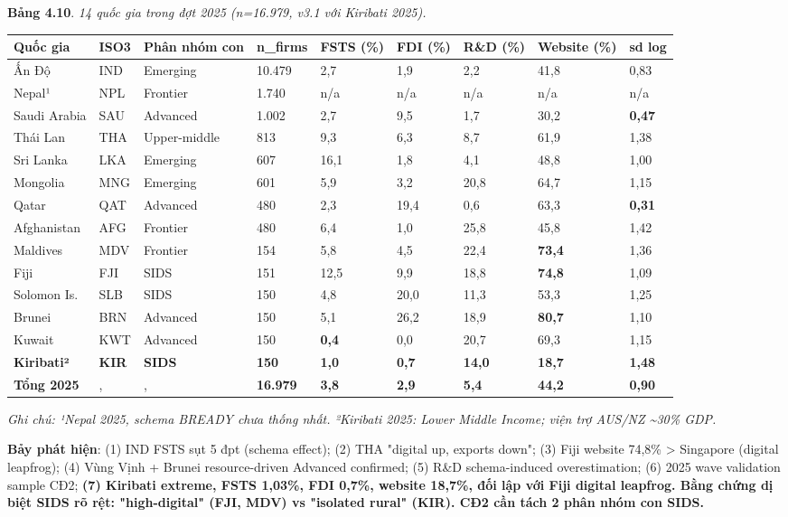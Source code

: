 \documentclass[12pt,a4paper]{article}
\begin{document}
\textbf{Bảng 4.10}. \emph{14 quốc gia trong đợt 2025 (n=16.979, v3.1 với
Kiribati 2025).}

\begin{longtable}[]{@{}lllllllll@{}}
\toprule\noalign{}
Quốc gia & ISO3 & Phân nhóm con & n\_firms & FSTS (\%) & FDI (\%) & R\&D
(\%) & Website (\%) & sd log \\
\midrule\noalign{}
\endhead
\bottomrule\noalign{}
\endlastfoot
Ấn Độ & IND & Emerging & 10.479 & 2,7 & 1,9 & 2,2 & 41,8 & 0,83 \\
Nepal¹ & NPL & Frontier & 1.740 & n/a & n/a & n/a & n/a & n/a \\
Saudi Arabia & SAU & Advanced & 1.002 & 2,7 & 9,5 & 1,7 & 30,2 &
\textbf{0,47} \\
Thái Lan & THA & Upper-middle & 813 & 9,3 & 6,3 & 8,7 & 61,9 & 1,38 \\
Sri Lanka & LKA & Emerging & 607 & 16,1 & 1,8 & 4,1 & 48,8 & 1,00 \\
Mongolia & MNG & Emerging & 601 & 5,9 & 3,2 & 20,8 & 64,7 & 1,15 \\
Qatar & QAT & Advanced & 480 & 2,3 & 19,4 & 0,6 & 63,3 &
\textbf{0,31} \\
Afghanistan & AFG & Frontier & 480 & 6,4 & 1,0 & 25,8 & 45,8 & 1,42 \\
Maldives & MDV & Frontier & 154 & 5,8 & 4,5 & 22,4 & \textbf{73,4} &
1,36 \\
Fiji & FJI & SIDS & 151 & 12,5 & 9,9 & 18,8 & \textbf{74,8} & 1,09 \\
Solomon Is. & SLB & SIDS & 150 & 4,8 & 20,0 & 11,3 & 53,3 & 1,25 \\
Brunei & BRN & Advanced & 150 & 5,1 & 26,2 & 18,9 & \textbf{80,7} &
1,10 \\
Kuwait & KWT & Advanced & 150 & \textbf{0,4} & 0,0 & 20,7 & 69,3 &
1,15 \\
\textbf{Kiribati²} & \textbf{KIR} & \textbf{SIDS} & \textbf{150} &
\textbf{1,0} & \textbf{0,7} & \textbf{14,0} & \textbf{18,7} &
\textbf{1,48} \\
\textbf{Tổng 2025} & , & , & \textbf{16.979} & \textbf{3,8} &
\textbf{2,9} & \textbf{5,4} & \textbf{44,2} & \textbf{0,90} \\
\end{longtable}

\emph{Ghi chú: ¹Nepal 2025, schema BREADY chưa thống nhất. ²Kiribati
2025: Lower Middle Income; viện trợ AUS/NZ \textasciitilde30\% GDP.}

\textbf{Bảy phát hiện}: (1) IND FSTS sụt 5 đpt (schema effect); (2) THA
"digital up, exports down"; (3) Fiji website 74,8\% \textgreater{}
Singapore (digital leapfrog); (4) Vùng Vịnh + Brunei resource-driven
Advanced confirmed; (5) R\&D schema-induced overestimation; (6) 2025
wave validation sample CĐ2; \textbf{(7) Kiribati extreme, FSTS 1,03\%,
FDI 0,7\%, website 18,7\%, đối lập với Fiji digital leapfrog. Bằng chứng
dị biệt SIDS rõ rệt: "high-digital" (FJI, MDV) vs "isolated rural"
(KIR). CĐ2 cần tách 2 phân nhóm con SIDS.}
\end{document}
